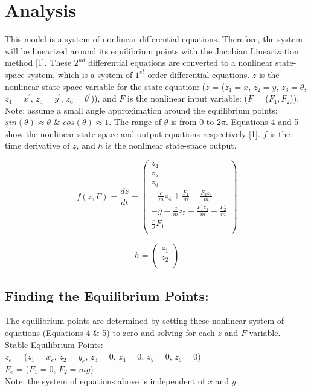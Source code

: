\documentclass[conference]{IEEEtran}
\begin{document}
\section{Analysis}
This model is a system of nonlinear differential equations. Therefore, the system will be linearized around its equilibrium points with the Jacobian Linearization method [1]. These $2^{nd}$ differential equations are converted to a nonlinear state-space system, which is a system of $1^{st}$  order differential equations. $z$ is the nonlinear state-space variable for the state equation: ($z$ = ($z_1 = x$, $z_2 = y$, $z_3 = \theta$, $z_4 = x^\prime$, $z_5 = y^\prime$, $z_6 = \theta^\prime$)), and $F$ is the nonlinear input variable: ($F$ = ($F_1, F_2$)).\\
\newpage
Note: assume a small angle approximation around the equilibrium points: $sin(\theta) \approx \theta$ \& $cos(\theta) \approx 1$. The range of $\theta$ is from 0 to $2\pi$. Equations 4 and 5 show the nonlinear state-space and output equations respectively [1]. $f$ is the time derivative of $z$, and $h$ is the nonlinear state-space output.

\[
f(z,F) = \frac{dz}{dt} =
\begin{pmatrix}
z_4\\
z_5\\
z_6 \\
-\frac{c}{m}z_4 + \frac{F_1}{m} -\frac{F_2z_3}{m}\\
-g - \frac{c}{m}z_5 + \frac{F_1z_3}{m} +\frac{F_2}{m}\\
\frac{r}{J}F_1\\
\end{pmatrix}  
\tag{4}
\]

\[
h = 
\begin{pmatrix}
z_1\\
z_2\\
\end{pmatrix}
\tag{5}
\]
\subsection{Finding the Equilibrium Points:}
The equilibrium points are determined by setting these nonlinear system of equations (Equations 4 \& 5) to zero and solving for each $z$ and $F$ variable. \\

\noindent Stable Equilibrium Points: \\
\indent $z_e$ = ($z_1 = x_e$, $z_2 = y_e$, $z_3 = 0$, $z_4 = 0$, $z_5 = 0$, $z_6 = 0$)\\
\indent $F_e$ = ($F_1 = 0$, $F_2 = mg$)\\
Note: the system of equations above is independent of $x$ and $y$. \\
\end{document}

